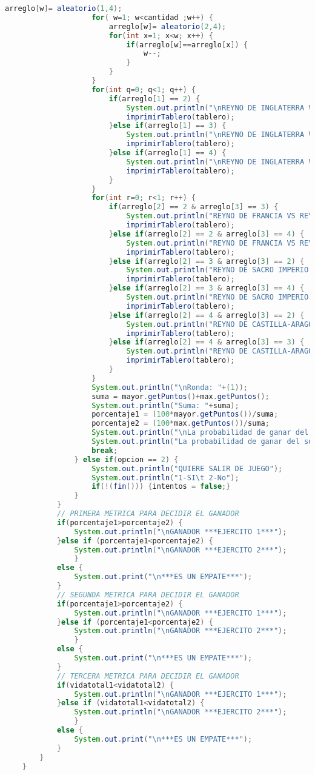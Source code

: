 \documentclass{article}
\begin{document}
\begin{itemize}
\begin{itemize}
\begin{lstlisting}[language=java]
					arreglo[w]= aleatorio(1,4);
					for( w=1; w<cantidad ;w++) {
						arreglo[w]= aleatorio(2,4);
						for(int x=1; x<w; x++) {
							if(arreglo[w]==arreglo[x]) {
								w--;
							}
						}
					}
					for(int q=0; q<1; q++) {
						if(arreglo[1] == 2) {
							System.out.println("\nREYNO DE INGLATERRA VS REYNO DE FRANCIA");
							imprimirTablero(tablero);
						}else if(arreglo[1] == 3) {
							System.out.println("\nREYNO DE INGLATERRA VS REYNO DE SACRO IMPERIO");
							imprimirTablero(tablero);
						}else if(arreglo[1] == 4) {
							System.out.println("\nREYNO DE INGLATERRA VS REYNO DE CASTILLA-ARAGON Y MOROS");
							imprimirTablero(tablero);
						}
					}
					for(int r=0; r<1; r++) {
						if(arreglo[2] == 2 & arreglo[3] == 3) {
							System.out.println("REYNO DE FRANCIA VS REYNO DE SACRO IMPERIO");
							imprimirTablero(tablero);
						}else if(arreglo[2] == 2 & arreglo[3] == 4) {
							System.out.println("REYNO DE FRANCIA VS REYNO DE CASTILLA-ARAGON Y MOROS");
							imprimirTablero(tablero);
						}else if(arreglo[2] == 3 & arreglo[3] == 2) {
							System.out.println("REYNO DE SACRO IMPERIO VS REYNO DE FRANCIA");
							imprimirTablero(tablero);
						}else if(arreglo[2] == 3 & arreglo[3] == 4) {
							System.out.println("REYNO DE SACRO IMPERIO VS REYNO DE CASTILLA-ARAGON Y MOROS");
							imprimirTablero(tablero);
						}else if(arreglo[2] == 4 & arreglo[3] == 2) {
							System.out.println("REYNO DE CASTILLA-ARAGON Y MOROS VS REYNO DE FRANCIA");
							imprimirTablero(tablero);
						}else if(arreglo[2] == 4 & arreglo[3] == 3) {
							System.out.println("REYNO DE CASTILLA-ARAGON Y MOROS VS REYNO DE SACRO IMPERIO");
							imprimirTablero(tablero);
						}
					}
					System.out.println("\nRonda: "+(1));
					suma = mayor.getPuntos()+max.getPuntos();
					System.out.println("Suma: "+suma);
					porcentaje1 = (100*mayor.getPuntos())/suma;
					porcentaje2 = (100*max.getPuntos())/suma;
					System.out.println("\nLa probabilidad de ganar del soldado del ejercito 1 es: "+porcentaje1+"%");
					System.out.println("La probabilidad de ganar del soldado del ejercito 2 es: "+porcentaje2+"%");
					break;
				} else if(opcion == 2) {
					System.out.println("QUIERE SALIR DE JUEGO");
					System.out.println("1-SI\t 2-No");
					if(!(fin())) {intentos = false;}
				}
			}
			// PRIMERA METRICA PARA DECIDIR EL GANADOR
			if(porcentaje1>porcentaje2) {
				System.out.println("\nGANADOR ***EJERCITO 1***");
			}else if (porcentaje1<porcentaje2) {
				System.out.println("\nGANADOR ***EJERCITO 2***");
				}
			else {
				System.out.print("\n***ES UN EMPATE***");
			}
			// SEGUNDA METRICA PARA DECIDIR EL GANADOR
			if(porcentaje1>porcentaje2) {
				System.out.println("\nGANADOR ***EJERCITO 1***");
			}else if (porcentaje1<porcentaje2) {
				System.out.println("\nGANADOR ***EJERCITO 2***");
				}
			else {
				System.out.print("\n***ES UN EMPATE***");
			}
			// TERCERA METRICA PARA DECIDIR EL GANADOR
			if(vidatotal1<vidatotal2) {
				System.out.println("\nGANADOR ***EJERCITO 1***");
			}else if (vidatotal1<vidatotal2) {
				System.out.println("\nGANADOR ***EJERCITO 2***");
				}
			else {
				System.out.print("\n***ES UN EMPATE***");
			}
		}
	}


\end{lstlisting}
\end{itemize}
\end{itemize}
\end{document}
